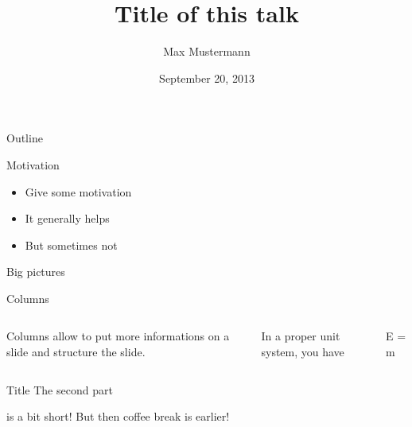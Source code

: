 \documentclass[mathserif]{beamer}
\title{Title of this talk}
\author{Max Mustermann}
\institute{University of Mustercity}
\date{September 20, 2013}
\newcommand\bad[1]{{\color{red}#1}}
\newcommand\good[1]{{\color{\sndcol}#1}}
\newcommand\sndcol\mygreenblue
\begin{document}
\begin{frame}
  \titlepage
\end{frame}


\begin{Bframe}{Outline}
  \tableofcontents
\end{Bframe}



\begin{Bframe}
  {Motivation}
  \begin{itemize}
    \item Give some motivation 
    \item It generally helps 
    \item But sometimes not
  \end{itemize}
\end{Bframe}

\begin{Bframe}
  {Big pictures}
\end{Bframe}

\begin{Bframe}
  {Columns}
  \begin{columns}
      Columns allow to put more informations on a slide and structure the slide.

      In a proper unit system, you have
      \begin{Balign}
        E = m 
      \end{Balign}
  \end{columns}
\end{Bframe}


\begin{Bframe}
  [Subtitle]{Title}
  The second part
  \pause

  is a bit \bad{short}! But then coffee break is \good{earlier}!
\end{Bframe}
\end{document}
